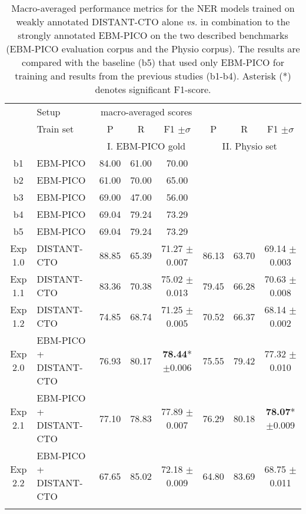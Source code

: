 \documentclass[letterpaper]{article} %
\begin{document}
%
%
%
\setlength{\tabcolsep}{4pt} %
\renewcommand{\arraystretch}{1.0}
\begin{table*}[hbt!]
    \centering
    \begin{tabular}{clccc|ccc}
        \Xhline{1pt}
         & Setup & \multicolumn{3}{c}{macro-averaged scores} \\
        \Xhline{1pt}
         & Train set & P & R & F1 $\pm\sigma$ & P & R & F1 $\pm\sigma$\\
        \hline 
        &  & \multicolumn{3}{c}{I. EBM-PICO gold} & \multicolumn{3}{c}{II. Physio set}  \\
        \hline
        b1 & EBM-PICO & 84.00 & 61.00 & 70.00 &  &  &\\
        b2 & EBM-PICO & 61.00 & 70.00 & 65.00 &  &  &\\
        b3 & EBM-PICO & 69.00 & 47.00 & 56.00 &  &  &\\
        b4 & EBM-PICO & 69.04 & 79.24 & 73.29 &  &  &\\
        b5 & EBM-PICO & 69.04 & 79.24 & 73.29 &  &  &\\
        \hline
        \hline 
        Exp 1.0 & DISTANT-CTO& 88.85 & 65.39 & 71.27 $\pm$0.007 & 86.13 & 63.70 & 69.14 $\pm$0.003\\
        Exp 1.1 & DISTANT-CTO & 83.36 & 70.38 & 75.02 $\pm$0.013 & 79.45 & 66.28 & 70.63 $\pm$0.008\\
        Exp 1.2 & DISTANT-CTO & 74.85 & 68.74 & 71.25 $\pm$0.005 & 70.52 & 66.37 & 68.14 $\pm$0.002 \\
        \Xhline 
        Exp 2.0 & EBM-PICO + DISTANT-CTO & 76.93  & 80.17  & \textbf{78.44}* $\pm$0.006 & 75.55  & 79.42 & 77.32 $\pm$0.010\\
        Exp 2.1 & EBM-PICO + DISTANT-CTO & 77.10 & 78.83 & 77.89 $\pm$0.007 & 76.29 & 80.18 & \textbf{78.07}* $\pm$0.009\\
        Exp 2.2 & EBM-PICO + DISTANT-CTO & 67.65 & 85.02 & 72.18 $\pm$0.009  & 64.80 & 83.69 & 68.75 $\pm$0.011 \\
        \Xhline{1pt}
    \end{tabular}
    \caption{Macro-averaged performance metrics for the NER models trained on weakly annotated DISTANT-CTO alone \textit{vs.} in combination to the strongly annotated EBM-PICO on the two described benchmarks (EBM-PICO evaluation corpus and the Physio corpus). The results are compared with the baseline (b5) that used only EBM-PICO for training and results from the previous studies (b1-b4). Asterisk (*) denotes significant F1-score.}
    \label{tab:results_modeltraining}
\end{table*}
%
\end{document}
